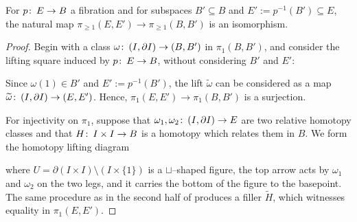 \begin{corollary}
For $p\colon\thinspace E \to B$ a fibration and for subspaces $B' \subseteq B$ and $E' := p^{-1}(B') \subseteq E$, the natural map $\pi_{\ge 1}(E, E') \to \pi_{\ge 1}(B, B')$ is an isomorphism.
\end{corollary}
\begin{proof}
Begin with a class $\omega \colon\thinspace (I, \partial I) \to (B, B')$ in $\pi_1(B, B')$, and consider the lifting square induced by $p\colon\thinspace E \to B$, without considering $B'$ and $E'$:
\begin{center}
\end{center}
Since $\omega(1) \in B'$ and $E' := p^{-1}(B')$, the lift $\widetilde \omega$ can be considered as a map $\widetilde\omega\colon\thinspace (I, \partial I) \to (E, E')$.
Hence, $\pi_1(E, E') \to \pi_1(B, B')$ is a surjection.

For injectivity on $\pi_1$, suppose that $\omega_1, \omega_2\colon\thinspace (I, \partial I) \to E$ are two relative homotopy classes and that $H\colon\thinspace I \times I \to B$ is a homotopy which relates them in $B$.
We form the homotopy lifting diagram
\begin{center}
\end{center}
where $U = \partial (I \times I) \setminus (I \times \{1\})$ is a $\sqcup$--shaped figure, the top arrow acts by $\omega_1$ and $\omega_2$ on the two legs, and it carries the bottom of the figure to the basepoint.
The same procedure as in the second half of  produces a filler $\widetilde H$, which witnesses equality in $\pi_1(E, E')$.%


\end{proof}
